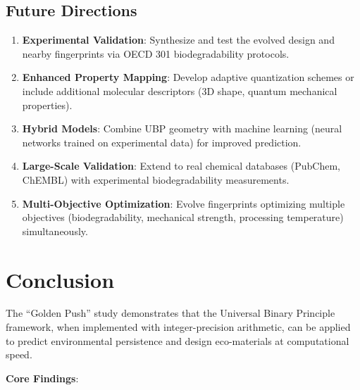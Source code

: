 \documentclass[11pt,letterpaper]{article}
\begin{document}
\subsection{Future Directions}

\begin{enumerate}
    \item \textbf{Experimental Validation}: Synthesize and test the evolved design and nearby fingerprints via OECD 301 biodegradability protocols.
    
    \item \textbf{Enhanced Property Mapping}: Develop adaptive quantization schemes or include additional molecular descriptors (3D shape, quantum mechanical properties).
    
    \item \textbf{Hybrid Models}: Combine UBP geometry with machine learning (neural networks trained on experimental data) for improved prediction.
    
    \item \textbf{Large-Scale Validation}: Extend to real chemical databases (PubChem, ChEMBL) with experimental biodegradability measurements.
    
    \item \textbf{Multi-Objective Optimization}: Evolve fingerprints optimizing multiple objectives (biodegradability, mechanical strength, processing temperature) simultaneously.
\end{enumerate}

\section{Conclusion}

The ``Golden Push'' study demonstrates that the Universal Binary Principle framework, when implemented with integer-precision arithmetic, can be applied to predict environmental persistence and design eco-materials at computational speed.

\textbf{Core Findings}:
\end{document}
